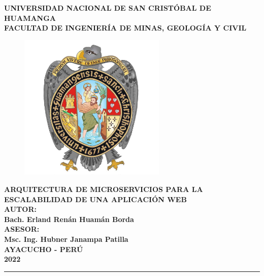 \begin{singlespace}
\begin{titlepage}

\centering
  { \fontsize{18pt}{\baselineskip}\selectfont \textbf{UNIVERSIDAD NACIONAL DE SAN CRISTÓBAL DE HUAMANGA} }\\[0.25cm]
  { \fontsize{16pt}{\baselineskip}\selectfont \textbf{FACULTAD DE INGENIERÍA DE MINAS, GEOLOGÍA Y CIVIL} }\\[0.55cm]

  \begin{figure}[htb]
    \centering
    \includegraphics[height=7cm]{src/assets/unsch_logo.jpg}
  \end{figure}

\vspace{0.5cm}
{\fontsize{14pt}{ \baselineskip}\selectfont \textbf{
  ARQUITECTURA DE MICROSERVICIOS PARA LA ESCALABILIDAD DE UNA APLICACIÓN WEB
}}\\[0.5cm]
{\fontsize{14pt}{ \baselineskip}\selectfont \textbf{AUTOR:}}\\[0.5cm]
{\fontsize{14pt}{ \baselineskip}\selectfont \textbf{Bach. Erland Renán Huamán Borda}}\\[0.5cm]
{\fontsize{14pt}{ \baselineskip}\selectfont \textbf{ASESOR:}}\\[0.5cm]
{\fontsize{14pt}{ \baselineskip}\selectfont \textbf{Msc. Ing. Hubner Janampa Patilla}}\\[0.5cm]

\vfill
{\fontsize{14pt}{ \baselineskip}\selectfont \textbf{AYACUCHO - PERÚ}}\\[0.5cm]
{\fontsize{14pt}{ \baselineskip}\selectfont \textbf{2022}}
\singlespacing
\rule{132mm}{0.25mm}\\

\end{titlepage}
\end{singlespace}
\restoregeometry
